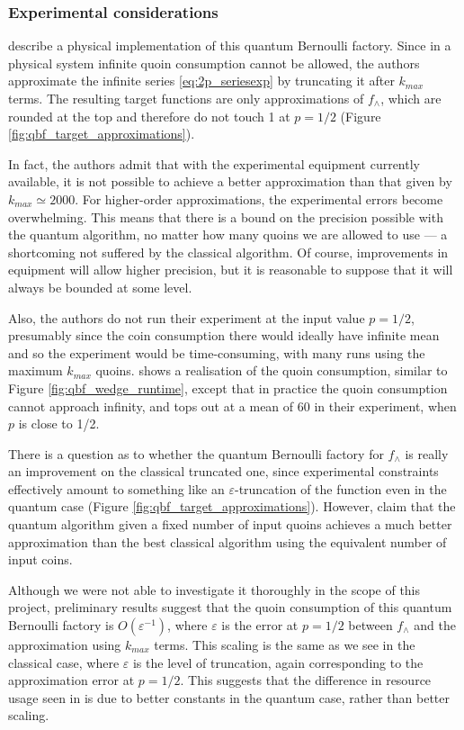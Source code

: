 \documentclass{article}
\theoremstyle{definition}
\begin{document}
\subsubsection{Experimental considerations}
\citet{patel2018} describe a physical implementation of this quantum Bernoulli factory. 
Since in a physical system infinite quoin consumption cannot be allowed, the authors approximate the infinite series \eqref{eq:2p_seriesexp} by truncating it after $k_{max}$ terms. The resulting target functions are only approximations of $f_\wedge$, which are rounded at the top and therefore do not touch 1 at $p=1/2$ (Figure \ref{fig:qbf_target_approximations}). %

In fact, the authors admit that with the experimental equipment currently available, it is not possible to achieve a better approximation than that given by $k_{max} \simeq 2000$. For higher-order approximations, the experimental errors become overwhelming. This means that there is a bound on the precision possible with the quantum algorithm, no matter how many quoins we are allowed to use --- a shortcoming not suffered by the classical algorithm. Of course, improvements in equipment will allow higher precision, but it is reasonable to suppose that it will always be bounded at some level.

Also, the authors do not run their experiment at the input value $p=1/2$, presumably since the coin consumption there would ideally have infinite mean and so the experiment would be time-consuming, with many runs using the maximum $k_{max}$ quoins.
\citet[Figure 3e]{patel2018} shows a realisation of the quoin consumption, similar to Figure \ref{fig:qbf_wedge_runtime}, except that in practice the quoin consumption cannot approach infinity, and tops out at a mean of 60 in their experiment, when $p$ is close to 1/2.

There is a question as to whether the quantum Bernoulli factory for $f_\wedge$ is really an improvement on the classical truncated one, since experimental constraints effectively amount to something like an $\varepsilon$-truncation of the function even in the quantum case (Figure \ref{fig:qbf_target_approximations}).
However, \citet{patel2018} claim that the quantum algorithm given a fixed number of input quoins achieves a much better approximation than the best classical algorithm using the equivalent number of input coins.

Although we were not able to investigate it thoroughly in the scope of this project, preliminary results suggest that the quoin consumption of this quantum Bernoulli factory is $O(\varepsilon^{-1})$, where $\varepsilon$ is the error at $p=1/2$ between $f_\wedge$ and the approximation using $k_{max}$ terms. This scaling is the same as we see in the classical case, where $\varepsilon$ is the level of truncation, again corresponding to the approximation error at $p=1/2$. This suggests that the difference in resource usage seen in \citet{patel2018} is due to better constants in the quantum case, rather than better scaling.
\end{document}
